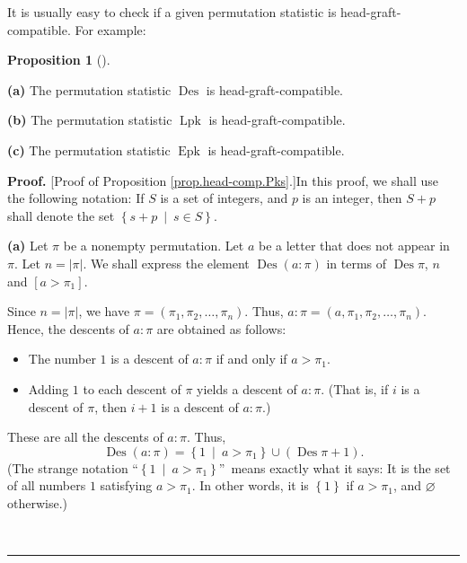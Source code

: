 \documentclass[numbers=enddot,12pt,final,onecolumn,notitlepage]{scrartcl}%
\theoremstyle{definition}
\newtheorem{prop}[theo]{Proposition}
\newenvironment{proposition}[1][]
{\begin{prop}[#1]\begin{leftbar}}
{\end{leftbar}\end{prop}}
\newenvironment{proof}[1][Proof]{\noindent\textbf{#1.} }{\ \rule{0.5em}{0.5em}}
\begin{document}
It is usually easy to check if a given permutation statistic is
head-graft-compatible. For example:

\begin{proposition}
\label{prop.head-comp.Pks}\textbf{(a)} The permutation statistic
$\operatorname*{Des}$ is head-graft-compatible.

\textbf{(b)} The permutation statistic $\operatorname*{Lpk}$ is head-graft-compatible.

\textbf{(c)} The permutation statistic $\operatorname*{Epk}$ is head-graft-compatible.
\end{proposition}

\begin{proof}
[Proof of Proposition \ref{prop.head-comp.Pks}.]In this proof, we shall use
the following notation: If $S$ is a set of integers, and $p$ is an integer,
then $S+p$ shall denote the set $\left\{  s+p\ \mid\ s\in S\right\}  $.

\textbf{(a)} Let $\pi$ be a nonempty permutation. Let $a$ be a letter that
does not appear in $\pi$. Let $n=\left\vert \pi\right\vert $. We shall express
the element $\operatorname*{Des}\left(  a:\pi\right)  $ in terms of
$\operatorname*{Des}\pi$, $n$ and $\left[  a>\pi_{1}\right]  $.

Since $n=\left\vert \pi\right\vert $, we have $\pi=\left(  \pi_{1},\pi
_{2},\ldots,\pi_{n}\right)  $. Thus, $a:\pi=\left(  a,\pi_{1},\pi_{2}%
,\ldots,\pi_{n}\right)  $. Hence, the descents of $a:\pi$ are obtained as follows:

\begin{itemize}
\item The number $1$ is a descent of $a:\pi$ if and only if $a>\pi_{1}$.

\item Adding $1$ to each descent of $\pi$ yields a descent of $a:\pi$. (That
is, if $i$ is a descent of $\pi$, then $i+1$ is a descent of $a:\pi$.)
\end{itemize}

These are all the descents of $a:\pi$. Thus,%
\begin{equation}
\operatorname*{Des}\left(  a:\pi\right)  =\left\{  1\ \mid\ a>\pi_{1}\right\}
\cup\left(  \operatorname*{Des}\pi+1\right)  .
\label{pf.prop.head-comp.Pks.a.1}%
\end{equation}
(The strange notation \textquotedblleft$\left\{  1\ \mid\ a>\pi_{1}\right\}
$\textquotedblright\ means exactly what it says: It is the set of all numbers
$1$ satisfying $a>\pi_{1}$. In other words, it is $\left\{  1\right\}  $ if
$a>\pi_{1}$, and $\varnothing$ otherwise.)


\end{proof}
\end{document}
